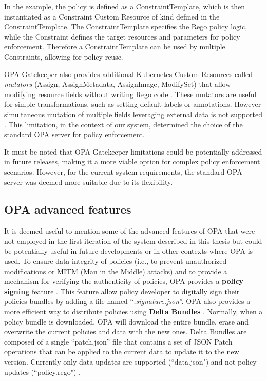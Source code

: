 In the example, the policy is defined as a ConstraintTemplate, which is then instantiated as a Constraint Custom Resource of kind defined in the ConstraintTemplate. 
The ConstraintTemplate specifies the Rego policy logic, while the Constraint defines the target resources and parameters for policy enforcement. Therefore a ConstraintTemplate can be used by multiple Constraints, allowing for policy reuse.

OPA Gatekeeper also provides additional Kubernetes Custom Resources called \textit{mutators} (Assign, AssignMetadata, AssignImage, ModifySet) that allow modifying resource fields without writing Rego code \cite{opa_gatekeeper}. 
These mutators are useful for simple transformations, such as setting default labels or annotations. However simultaneous mutation of multiple fields leveraging external data is not supported \cite{opa_gatekeeper_external_data}. 
This limitation, in the context of our system, determined the choice of the standard OPA server for policy enforcement. \newline

It must be noted that OPA Gatekeeper limitations could be potentially addressed in future releases, making it a more viable option for complex policy enforcement scenarios. 
However, for the current system requirements, the standard OPA server was deemed more suitable due to its flexibility.

\subsection{OPA advanced features}

It is deemed useful to mention some of the advanced features of OPA that were not employed in the first iteration of the system described in this thesis but could be potentially useful in future developments or in other contexts where OPA is used.
\newline
To ensure data integrity of policies (i.e., to prevent unauthorized modifications or MITM (Man in the Middle) attacks) and to provide a mechanism for verifying the authenticity of policies, OPA provides a \textbf{policy signing} feature \cite{opa_signing}.
This feature allow policy developer to digitally sign their policies bundles by adding a file named ``\textit{.signature.json}''.
\newline
OPA also provides a more efficient way to distribute policies using \textbf{Delta Bundles} \cite{opa_delta_bundles}.
Normally, when a policy bundle is downloaded, OPA will download the entire bundle, erase and overwrite the current policies and data with the new ones.
Delta Bundles are composed of a single ``patch.json'' file that contains a set of JSON Patch operations that can be applied to the current data to update it to the new version. Currently only data updates are supported (``data.json") and not policy updates (``policy.rego") \cite{opa_delta_bundles}.

